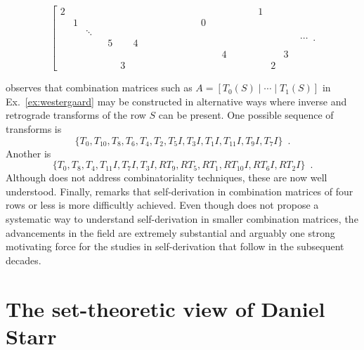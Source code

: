 \begin{example}
	\begin{equation}
    	\left[
    	\begin{array}{cccccccccccc|cccccccccccc|}
        	2 &&&&&&&&&&&      &  &&&&&&&& 1 &&& \\
        	& 1 &&&&&&&&&&     &  && 0 &&&&&&&&& \\
        	&& \ddots &&&&&&&&&        &  &&&&&&&&&&& \\
        	&&&& 5 && 4 &&&&&  &  &&&&&&&&&&& \\
        	&&&&&&&&&&&        &  &&&& 4 &&&&&& 3 & \\
        	&&&&& 3 &&&&&&     &  &&&&&&&&& 2 &&
    	\end{array}
    	\cdots \right. \enspace.
	\end{equation}
\end{example}

\cite[102]{Westergaard1966} observes that combination matrices such as $A = [T_0(S) \; | \; \cdots \; | \; T_1(S)]$ in Ex.~\ref{ex:westergaard} may be constructed in alternative ways where inverse and retrograde transforms of the row $S$ can be present. One possible sequence of transforms is
\begin{equation}
	\{ T_0, T_{10}, T_{8}, T_{6}, T_{4}, T_{2}, T_{5}I, T_{3}I, T_{1}I, T_{11}I, T_{9}I, T_{7}I \} \enspace .
\end{equation}
\noindent Another is
\begin{equation}
	\{ T_0, T_{8}, T_{4}, T_{11}I, T_{7}I, T_{3}I, RT_{9}, RT_{5}, RT_{1}, RT_{10}I, RT_{6}I, RT_{2}I \} \enspace .
\end{equation}
\noindent Although \cite{Westergaard1966} does not address combinatoriality techniques, these are now well understood. Finally, \cite[108]{Westergaard1966} remarks that self-derivation in combination matrices of four rows or less is more difficultly achieved. Even though \cite{Westergaard1966} does not propose a systematic way to understand self-derivation in smaller combination matrices, the advancements in the field are extremely substantial and arguably one strong motivating force for the studies in self-derivation that follow in the subsequent decades.

\section{The set-theoretic view of Daniel Starr}

